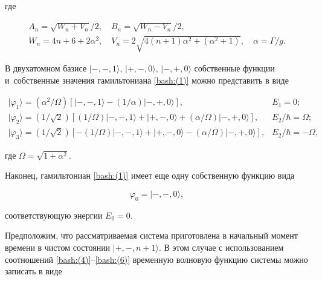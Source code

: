 где

\begin{gather}

A_n=\sqrt{W_n+V_n}/2, \quad B_n=\sqrt{W_n-V_n}/2,

\\

W_n= 4n+6+2\alpha^2,\quad V_n=2\sqrt{4(n+1)\alpha^2+(\alpha^2+1)}, \quad 

\alpha = \Gamma /g.

\end{gather}



В двухатомном базисе $|-,-, 1\rangle$,  $|+,-, 0\rangle$, $|-,+, 0\rangle$  собственные функции и~собственные значения гамильтониана \eqref{bash:(1)}  можно представить в виде

\begin{equation}

\begin{array}{ll}

| \varphi_{1}\rangle = (\alpha^2/\Omega)[ |-,-, 1\rangle - (1/\alpha) |-,+, 0\rangle ], & E_1 = 0; 

\\

| \varphi_{2}\rangle = (1/\sqrt{2})[ (1/\Omega)|-,-, 1\rangle + |+,-, 0\rangle +  (\alpha/\Omega) |-,+, 0\rangle ], & E_2/\hbar = \Omega; 

\\

| \varphi_{3}\rangle = (1/\sqrt{2})[- (1/\Omega)|-,-, 1\rangle + |+,-, 0\rangle -  (\alpha/\Omega) |-,+, 0\rangle ], & E_2/\hbar = - \Omega, 

\end{array}

\label{bash:(7)}

\end{equation}

где $\Omega = \sqrt{1+\alpha^2}$.



Наконец, гамильтониан \eqref{bash:(1)} имеет еще одну собственную функцию вида 

$$\varphi_0 =|-,-, 0\rangle, 

$$

 соответствующую энергии $E_0 =0$.



Предположим, что рассматриваемая система приготовлена в начальный момент времени в чистом состоянии $|+,-,n+1\rangle$. В этом случае с использованием соотношений \eqref{bash:(4)}--\eqref{bash:(6)} временную волновую функцию системы можно записать в виде

